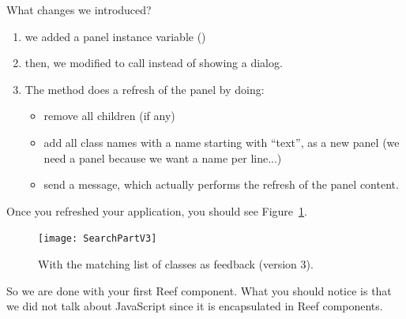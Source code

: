 \documentclass[a4paper,10pt,twoside]{book}
\begin{document}

What changes we introduced?
\begin{enumerate}
\item we added a panel instance variable () 
\item then, we modified  to call  instead of showing a dialog. 
\item The  method does a refresh of the panel by doing:
\begin{itemize}
\item remove all children (if any) 
\item add all class names with a name starting with ``text'', as a new panel (we need a
panel because we want a name per line...) 
\item send a  message, which actually performs the refresh of the panel
content. 
\end{itemize}
\end{enumerate}


Once you refreshed your application, you should see Figure~\ref{third}.

\begin{figure}[h]
\begin{center}
\texttt{[image: SearchPartV3]}
\caption{With the matching list of classes as feedback (version 3).\label{third}}
\end{center}
\end{figure}

So we are done with your first Reef component. What you should notice is that we did not talk about JavaScript since it is encapsulated in Reef components. 

\section{}



\ifx\wholebook\relax\else
   
   
\end{document}
